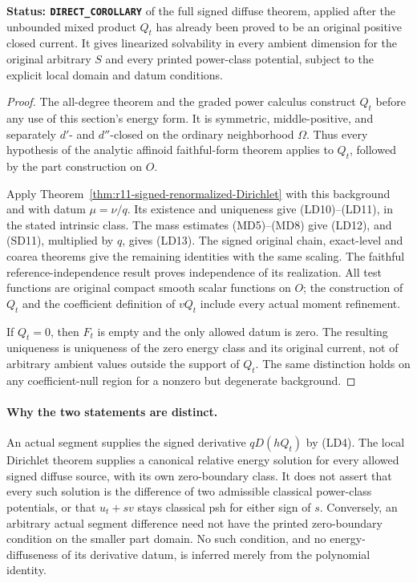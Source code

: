 \documentclass[11pt,a4paper]{article}
\numberwithin{equation}{section}
\theoremstyle{definition}
\theoremstyle{remark}
\begin{document}
\noindent\textbf{Status: \texttt{DIRECT\_COROLLARY}} of the full
signed diffuse theorem, applied after the unbounded mixed product
$Q_t$ has already been proved to be an original positive closed
current.  It gives linearized solvability in every ambient dimension
for the original arbitrary $S$ and every printed power-class
potential, subject to the explicit local domain and datum conditions.

\begin{proof}
The all-degree theorem and the graded power calculus construct $Q_t$
before any use of this section's energy form.  It is symmetric,
middle-positive, and separately $d'$- and $d''$-closed on the ordinary
neighborhood $\Omega$.  Thus every hypothesis of the analytic
affinoid faithful-form theorem applies to $Q_t$, followed by the
part construction on $O$.

Apply Theorem~\ref{thm:r11-signed-renormalized-Dirichlet} with this
background and with datum $\mu=\nu/q$.  Its existence and uniqueness
give (LD10)--(LD11), in the stated intrinsic class.  The mass estimates
(MD5)--(MD8) give (LD12), and (SD11), multiplied by $q$, gives
(LD13).  The signed original chain, exact-level and coarea theorems
give the remaining identities with the same scaling.  The faithful
reference-independence result proves independence of its realization.
All test functions are original compact smooth scalar functions on
$O$; the construction of $Q_t$ and the coefficient definition of
$vQ_t$ include every actual moment refinement.

If $Q_t=0$, then $F_t$ is empty and the only allowed datum is zero.
The resulting uniqueness is uniqueness of the zero energy class and
its original current, not of arbitrary ambient values outside the
support of $Q_t$.  The same distinction holds on any coefficient-null
region for a nonzero but degenerate background.
\end{proof}

\paragraph{Why the two statements are distinct.}
An actual segment supplies the signed derivative $qD(hQ_t)$ by
(LD4).  The local Dirichlet theorem supplies a canonical relative
energy solution for every allowed signed diffuse source, with its
own zero-boundary class.  It does not assert that every such solution
is the difference of two admissible classical power-class potentials,
or that $u_t+sv$ stays classical psh for either sign of $s$.
Conversely, an arbitrary actual segment difference need not have the
printed zero-boundary condition on the smaller part domain.  No such
condition, and no energy-diffuseness of its derivative datum, is
inferred merely from the polynomial identity.
\end{document}

